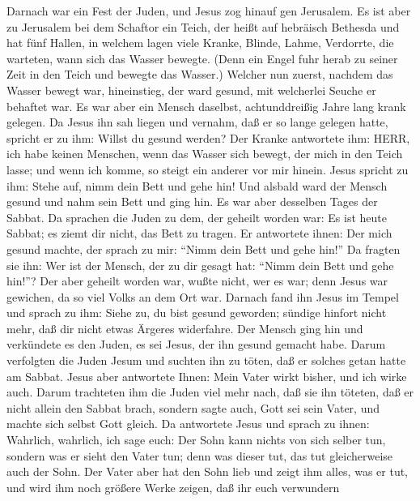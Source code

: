  Darnach war ein Fest der Juden, und Jesus zog hinauf gen
Jerusalem.  Es ist aber zu Jerusalem bei dem Schaftor ein
Teich, der heißt auf hebräisch Bethesda und hat fünf Hallen,
 in welchem lagen viele Kranke, Blinde, Lahme, Verdorrte,
die warteten, wann sich das Wasser bewegte.  (Denn ein Engel
fuhr herab zu seiner Zeit in den Teich und bewegte das Wasser.) Welcher
nun zuerst, nachdem das Wasser bewegt war, hineinstieg, der ward gesund,
mit welcherlei Seuche er behaftet war.  Es war aber ein
Mensch daselbst, achtunddreißig Jahre lang krank gelegen. 
Da Jesus ihn sah liegen und vernahm, daß er so lange gelegen hatte,
spricht er zu ihm: Willst du gesund werden?  Der Kranke
antwortete ihm: HERR, ich habe keinen Menschen, wenn das Wasser sich
bewegt, der mich in den Teich lasse; und wenn ich komme, so steigt ein
anderer vor mir hinein.  Jesus spricht zu ihm: Stehe auf,
nimm dein Bett und gehe hin!  Und alsbald ward der Mensch
gesund und nahm sein Bett und ging hin. Es war aber desselben Tages der
Sabbat.  Da sprachen die Juden zu dem, der geheilt worden
war: Es ist heute Sabbat; es ziemt dir nicht, das Bett zu tragen.
 Er antwortete ihnen: Der mich gesund machte, der sprach zu
mir: ``Nimm dein Bett und gehe hin!''  Da fragten sie ihn:
Wer ist der Mensch, der zu dir gesagt hat: ``Nimm dein Bett und gehe
hin!''?  Der aber geheilt worden war, wußte nicht, wer es
war; denn Jesus war gewichen, da so viel Volks an dem Ort war.
 Darnach fand ihn Jesus im Tempel und sprach zu ihm: Siehe
zu, du bist gesund geworden; sündige hinfort nicht mehr, daß dir nicht
etwas Ärgeres widerfahre.  Der Mensch ging hin und
verkündete es den Juden, es sei Jesus, der ihn gesund gemacht habe.
 Darum verfolgten die Juden Jesum und suchten ihn zu töten,
daß er solches getan hatte am Sabbat.  Jesus aber
antwortete Ihnen: Mein Vater wirkt bisher, und ich wirke auch.
 Darum trachteten ihm die Juden viel mehr nach, daß sie ihn
töteten, daß er nicht allein den Sabbat brach, sondern sagte auch, Gott
sei sein Vater, und machte sich selbst Gott gleich.  Da
antwortete Jesus und sprach zu ihnen: Wahrlich, wahrlich, ich sage euch:
Der Sohn kann nichts von sich selber tun, sondern was er sieht den Vater
tun; denn was dieser tut, das tut gleicherweise auch der Sohn.
 Der Vater aber hat den Sohn lieb und zeigt ihm alles, was
er tut, und wird ihm noch größere Werke zeigen, daß ihr euch verwundern
